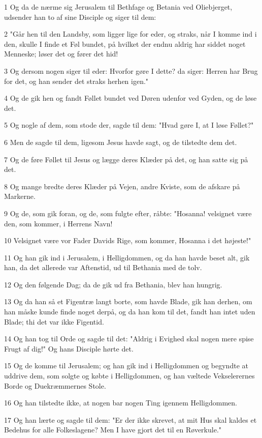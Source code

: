 \par 1 Og da de nærme sig Jerusalem til Bethfage og Betania ved Oliebjerget, udsender han to af sine Disciple og siger til dem:
\par 2 "Går hen til den Landsby, som ligger lige for eder, og straks, når I komme ind i den, skulle I finde et Føl bundet, på hvilket der endnu aldrig har siddet noget Menneske; løser det og fører det hid!
\par 3 Og dersom nogen siger til eder: Hvorfor gøre I dette? da siger: Herren har Brug for det, og han sender det straks herhen igen."
\par 4 Og de gik hen og fandt Føllet bundet ved Døren udenfor ved Gyden, og de løse det.
\par 5 Og nogle af dem, som stode der, sagde til dem: "Hvad gøre I, at I løse Føllet?"
\par 6 Men de sagde til dem, ligesom Jesus havde sagt, og de tilstedte dem det.
\par 7 Og de føre Føllet til Jesus og lægge deres Klæder på det, og han satte sig på det.
\par 8 Og mange bredte deres Klæder på Vejen, andre Kviste, som de afskare på Markerne.
\par 9 Og de, som gik foran, og de, som fulgte efter, råbte: "Hosanna! velsignet være den, som kommer, i Herrens Navn!
\par 10 Velsignet være vor Fader Davids Rige, som kommer, Hosanna i det højeste!"
\par 11 Og han gik ind i Jerusalem, i Helligdommen, og da han havde beset alt, gik han, da det allerede var Aftenstid, ud til Bethania med de tolv.
\par 12 Og den følgende Dag; da de gik ud fra Bethania, blev han hungrig.
\par 13 Og da han så et Figentræ langt borte, som havde Blade, gik han derhen, om han måske kunde finde noget derpå, og da han kom til det, fandt han intet uden Blade; thi det var ikke Figentid.
\par 14 Og han tog til Orde og sagde til det: "Aldrig i Evighed skal nogen mere spise Frugt af dig!" Og hans Disciple hørte det.
\par 15 Og de komme til Jerusalem; og han gik ind i Helligdommen og begyndte at uddrive dem, som solgte og købte i Helligdommen, og han væltede Vekselerernes Borde og Duekræmmernes Stole.
\par 16 Og han tilstedte ikke, at nogen bar nogen Ting igennem Helligdommen.
\par 17 Og han lærte og sagde til dem: "Er der ikke skrevet, at mit Hus skal kaldes et Bedehus for alle Folkeslagene? Men I have gjort det til en Røverkule."
